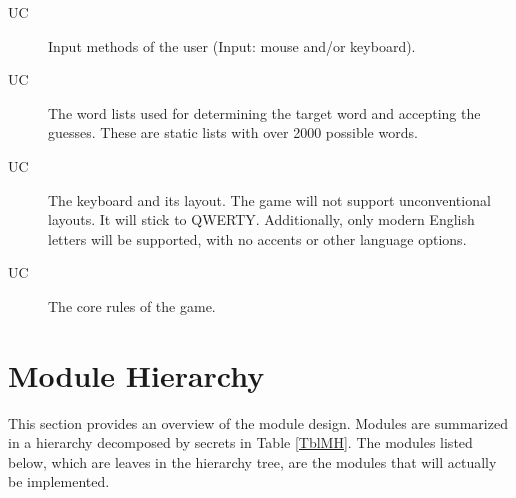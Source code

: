 \documentclass[12pt, titlepage]{article}
\newcounter{ucnum}
\newcommand{\uctheucnum}{UC\theucnum}
\begin{document}
	\begin{description}
		\item[ \uctheucnum] Input methods of the user
		(Input: mouse and/or keyboard). 
		\item[ \uctheucnum] The word lists used for determining the target word and accepting the guesses. These are static lists with over 2000 possible words.
		\item[ \uctheucnum] The keyboard and its layout. The game will not support unconventional layouts. It will stick to QWERTY. Additionally, only modern English letters will be supported, with no accents or other language options. 
		\item[ \uctheucnum] The core rules of the game.
	\end{description}
	
	\section{Module Hierarchy} \label{SecMH}
	
	This section provides an overview of the module design. Modules are summarized
	in a hierarchy decomposed by secrets in Table \ref{TblMH}. The modules listed
	below, which are leaves in the hierarchy tree, are the modules that will
	actually be implemented.
	
\end{document}
